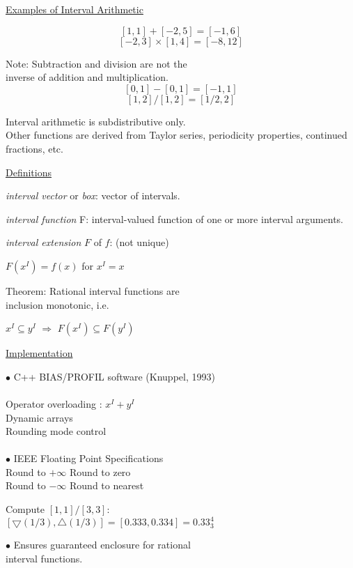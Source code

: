 \documentclass{slides}
\begin{document}
\begin{slide}
\begin{center}
\underline{Examples of Interval Arithmetic}
\end{center}
$$[1,1] + [-2,5] = [-1,6]$$
$$[-2,3] \times [1,4] = [-8,12]$$



Note:
Subtraction and division are not the \\
inverse of addition and multiplication.
$$[0,1]-[0,1] = [-1,1]$$
$$[1,2]/[1,2] = [1/2, 2]$$

Interval arithmetic is subdistributive only. \\

Other functions are derived from Taylor series, periodicity properties,
continued fractions, etc.

\end{slide}
\begin{slide}
\begin{center}
\underline{Definitions}
\end{center}
{\it interval vector} or {\it box}: vector of intervals.

{\it interval function} F: interval-valued function of one or more
interval arguments. 

{\it interval extension} $F$ of $f$:  (not unique)
\begin{center}
$F(x^I) = f(x)$ for $x^I = x$
\end{center}

Theorem: Rational interval functions are \\
inclusion monotonic, i.e. 
\begin{center}
$x^I \subseteq  y^I$ $\Rightarrow$ $F( x^I) \subseteq  F(y^I)$
\end{center}

\es
\bs
\begin{center}
\underline{Implementation}
\end{center}

$\bullet$ C++ BIAS/PROFIL software (Knuppel, 1993)\\
\\
Operator overloading : $x^I + y^I$\\
Dynamic arrays\\
Rounding mode control \\
\\
$\bullet$ IEEE Floating Point Specifications \\
Round to $+\infty$ \qquad Round to zero \\
Round to $-\infty$ \qquad Round to nearest 

Compute $ [1,1]/[3,3]$: \\
$[\bigtriangledown(1/3),\bigtriangleup(1/3)] = [0.333,0.334]=0.33_3^4$

$\bullet $ Ensures guaranteed enclosure for rational \\
interval functions.

\end{slide}
\end{document}
